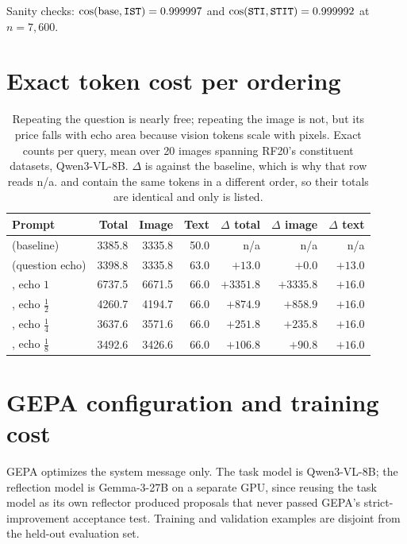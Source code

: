 Sanity checks: $\cos(\text{base}, \texttt{IST}{}) = 0.999997$ and
$\cos(\texttt{STI}{}, \texttt{STIT}{}) = 0.999992$ at $n = 7{,}600$.

\section{Exact token cost per ordering}
\label{app:cost}

\begin{table}[h]
\caption{Repeating the question is nearly free; repeating the image is not, but
its price falls with echo area because vision tokens scale with pixels. Exact
counts per query, mean over 20 images spanning RF20's constituent datasets,
Qwen3-VL-8B. $\Delta$ is against the \sti{} baseline, which is why that row
reads n/a. \sti{} and \sit{} contain the same tokens in a different order, so
their totals are identical and only \sti{} is listed.}
\label{tab:cost}
\begin{center}
\begin{tabular}{lrrrrrr}
\toprule
Prompt & Total & Image & Text & $\Delta$ total & $\Delta$ image & $\Delta$ text \\
\midrule
\sti{} (baseline)            & 3385.8 & 3335.8 & 50.0 & n/a & n/a & n/a \\
\stit{} (question echo)      & 3398.8 & 3335.8 & 63.0 & $+13.0$ & $+0.0$ & $+13.0$ \\
\sitit{}, echo $1$           & 6737.5 & 6671.5 & 66.0 & $+3351.8$ & $+3335.8$ & $+16.0$ \\
\sitit{}, echo $\tfrac{1}{2}$ & 4260.7 & 4194.7 & 66.0 & $+874.9$ & $+858.9$ & $+16.0$ \\
\sitit{}, echo $\tfrac{1}{4}$ & 3637.6 & 3571.6 & 66.0 & $+251.8$ & $+235.8$ & $+16.0$ \\
\sitit{}, echo $\tfrac{1}{8}$ & 3492.6 & 3426.6 & 66.0 & $+106.8$ & $+90.8$ & $+16.0$ \\
\bottomrule
\end{tabular}
\end{center}
\end{table}

\section{GEPA configuration and training cost}
\label{app:gepa}


GEPA \citep{gepa2025} optimizes the system message only. The task model is
Qwen3-VL-8B; the reflection model is Gemma-3-27B on a separate GPU, since
reusing the task model as its own reflector produced proposals that never passed
GEPA's strict-improvement acceptance test. Training and validation examples are
disjoint from the held-out evaluation set.


